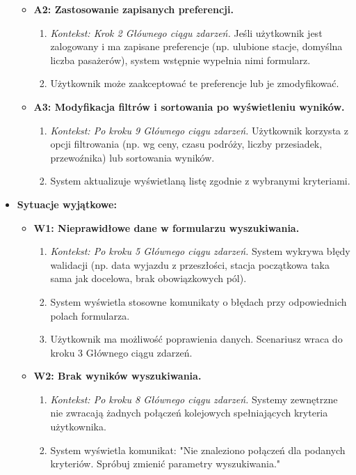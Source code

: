 \documentclass[a4paper,12pt]{article}
\begin{document}
\begin{itemize}
\begin{itemize}
\begin{enumerate}
\end{enumerate}
\item \textbf{A2: Zastosowanie zapisanych preferencji.}
\begin{enumerate}
\item \textit{Kontekst: Krok 2 Głównego ciągu zdarzeń.} Jeśli użytkownik jest zalogowany i ma zapisane preferencje (np. ulubione stacje, domyślna liczba pasażerów), system wstępnie wypełnia nimi formularz.
\item Użytkownik może zaakceptować te preferencje lub je zmodyfikować.
\end{enumerate}
\item \textbf{A3: Modyfikacja filtrów i sortowania po wyświetleniu wyników.}
\begin{enumerate}
\item \textit{Kontekst: Po kroku 9 Głównego ciągu zdarzeń.} Użytkownik korzysta z opcji filtrowania (np. wg ceny, czasu podróży, liczby przesiadek, przewoźnika) lub sortowania wyników.
\item System aktualizuje wyświetlaną listę zgodnie z wybranymi kryteriami.
\end{enumerate}
\end{itemize}
\item \textbf{Sytuacje wyjątkowe:}
\begin{itemize}
\item \textbf{W1: Nieprawidłowe dane w formularzu wyszukiwania.}
\begin{enumerate}
\item \textit{Kontekst: Po kroku 5 Głównego ciągu zdarzeń.} System wykrywa błędy walidacji (np. data wyjazdu z przeszłości, stacja początkowa taka sama jak docelowa, brak obowiązkowych pól).
\item System wyświetla stosowne komunikaty o błędach przy odpowiednich polach formularza.
\item Użytkownik ma możliwość poprawienia danych. Scenariusz wraca do kroku 3 Głównego ciągu zdarzeń.
\end{enumerate}
\item \textbf{W2: Brak wyników wyszukiwania.}
\begin{enumerate}
\item \textit{Kontekst: Po kroku 8 Głównego ciągu zdarzeń.} Systemy zewnętrzne nie zwracają żadnych połączeń kolejowych spełniających kryteria użytkownika.
\item System wyświetla komunikat: "Nie znaleziono połączeń dla podanych kryteriów. Spróbuj zmienić parametry wyszukiwania."

\end{enumerate}
\end{itemize}
\end{itemize}
\end{document}
